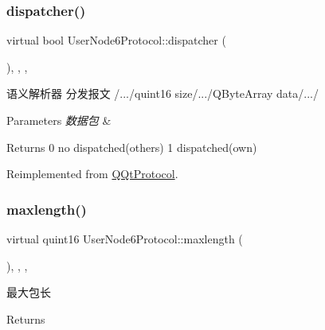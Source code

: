 \subsubsection{\texorpdfstring{dispatcher()}{dispatcher()}}
{\footnotesize\ttfamily virtual bool User\+Node6\+Protocol\+::dispatcher (\begin{DoxyParamCaption}\item[{const Q\+Byte\+Array \&}]{ }\end{DoxyParamCaption})\hspace{0.3cm}{\ttfamily [inline]}, {\ttfamily [override]}, {\ttfamily [protected]}, {\ttfamily [virtual]}}



语义解析器 分发报文 /.../quint16 size/.../\+Q\+Byte\+Array data/.../ 


\begin{DoxyParams}{Parameters}
{\em 数据包} & \\
\hline
\end{DoxyParams}
\begin{DoxyReturn}{Returns}
0 no dispatched(others) 1 dispatched(own) 
\end{DoxyReturn}


Reimplemented from \mbox{\hyperlink{class_q_qt_protocol_a35a69c4b89c8cf7459038f40d75e0dc9}{Q\+Qt\+Protocol}}.

\mbox{\label{class_user_node6_protocol_aa4d6a7d01f74b99c730a2cf5e41b0954}} 
\subsubsection{\texorpdfstring{maxlength()}{maxlength()}}
{\footnotesize\ttfamily virtual quint16 User\+Node6\+Protocol\+::maxlength (\begin{DoxyParamCaption}{ }\end{DoxyParamCaption})\hspace{0.3cm}{\ttfamily [inline]}, {\ttfamily [override]}, {\ttfamily [protected]}, {\ttfamily [virtual]}}



最大包长 

\begin{DoxyReturn}{Returns}

\end{DoxyReturn}


